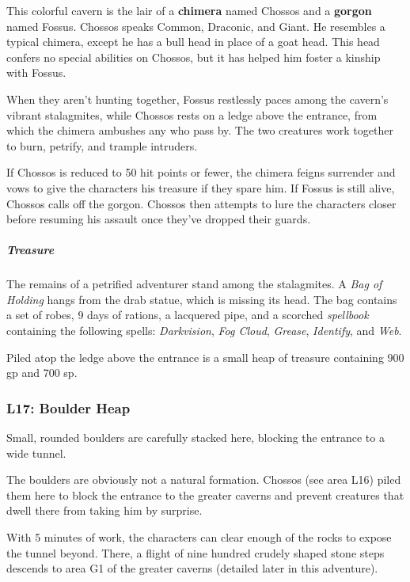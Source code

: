 \documentclass[10pt,a4paper,twoside,bg=print,twocolumn,openany,nodeprecatedcode]{dndbook}
\begin{document}
This colorful cavern is the lair of a \textbf{chimera} named Chossos and a \textbf{gorgon} named Fossus. Chossos speaks Common, Draconic, and Giant. He resembles a typical chimera, except he has a bull head in place of a goat head. This head confers no special abilities on Chossos, but it has helped him foster a kinship with Fossus.

When they aren't hunting together, Fossus restlessly paces among the cavern's vibrant stalagmites, while Chossos rests on a ledge above the entrance, from which the chimera ambushes any who pass by. The two creatures work together to burn, petrify, and trample intruders.

If Chossos is reduced to 50 hit points or fewer, the chimera feigns surrender and vows to give the characters his treasure if they spare him. If Fossus is still alive, Chossos calls off the gorgon. Chossos then attempts to lure the characters closer before resuming his assault once they've dropped their guards.

\subparagraph{Treasure}
The remains of a petrified adventurer stand among the stalagmites. A \textit{Bag of Holding} hangs from the drab statue, which is missing its head. The bag contains a set of robes, 9 days of rations, a lacquered pipe, and a scorched \textit{spellbook} containing the following spells: \textit{Darkvision}, \textit{Fog Cloud}, \textit{Grease}, \textit{Identify}, and \textit{Web}.

Piled atop the ledge above the entrance is a small heap of treasure containing 900 gp and 700 sp.

\subsubsection{L17: Boulder Heap}
\begin{DndReadAloud}{}
Small, rounded boulders are carefully stacked here, blocking the entrance to a wide tunnel.

\end{DndReadAloud}

The boulders are obviously not a natural formation. Chossos (see area L16) piled them here to block the entrance to the greater caverns and prevent creatures that dwell there from taking him by surprise.

With 5 minutes of work, the characters can clear enough of the rocks to expose the tunnel beyond. There, a flight of nine hundred crudely shaped stone steps descends to area G1 of the greater caverns (detailed later in this adventure).
\end{document}
